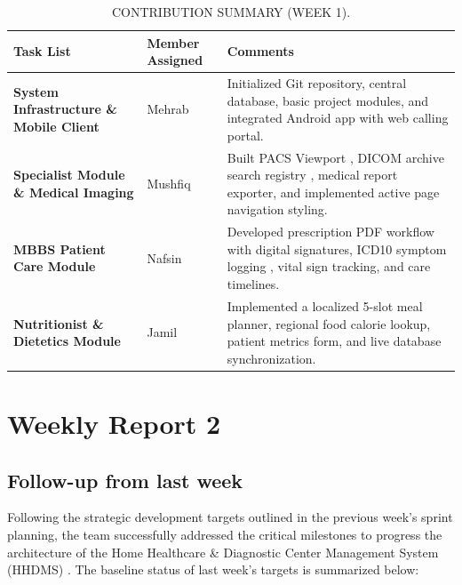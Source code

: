 \documentclass[onecolumn,journal]{IEEEtran}
\begin{document}
	\begin{table}[H]
		\centering
		\small
		\renewcommand{\arraystretch}{1.5}
		\begin{tabularx}{\textwidth}{>{\raggedright\arraybackslash}p{} >{\raggedright\arraybackslash}p{} >{\raggedright\arraybackslash}X}
			\toprule
			\textbf{Task List} & \textbf{Member Assigned} & \textbf{Comments} \\
			\midrule
			\textbf{System Infrastructure \& Mobile Client} & Mehrab & Initialized Git repository, central database, basic project modules, and integrated Android app with web calling portal. \\
			\textbf{Specialist Module \& Medical Imaging} & Mushfiq & Built PACS Viewport \cite{pacs2001}, DICOM archive search registry \cite{dicom2021}, medical report exporter, and implemented active page navigation styling. \\
			\textbf{MBBS Patient Care Module} & Nafsin & Developed prescription PDF workflow with digital signatures, ICD10 symptom logging \cite{who2016icd10}, vital sign tracking, and care timelines. \\
			\textbf{Nutritionist \& Dietetics Module} & Jamil & Implemented a localized 5-slot meal planner, regional food calorie lookup, patient metrics form, and live database synchronization. \\
			\bottomrule
		\end{tabularx}
		\vspace{12pt}
		\caption{CONTRIBUTION SUMMARY (WEEK 1).}
		\label{tab:contribution_summary_w1}
	\end{table}
	
	\FloatBarrier
	\section{Weekly Report 2}
	\subsection{Follow-up from last week}
	
	Following the strategic development targets outlined in the previous week's sprint planning, the team successfully addressed the critical milestones to progress the architecture of the Home Healthcare \& Diagnostic Center Management System (HHDMS) \cite{srs2026}. The baseline status of last week's targets is summarized below:
	
\end{document}
